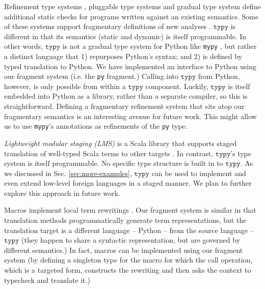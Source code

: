 \documentclass[preprint,10pt]{sigplanconf}
\newcommand{\typy}{\texttt{typy}}
\newcommand{\lip}[1]{\lstinline[language=Python,basicstyle=\ttfamily\footnotesize,deletendkeywords={tuple,buffer,map}]{#1}}
\newcommand{\li}[1]{\lip{#1}}
\begin{document}
Refinement type systems \cite{Freeman91}, pluggable type systems \cite{Brac04a,Andreae:2006:FIP:1167473.1167479,brown2016build,DBLP:journals/toplas/MarkstrumMEMAN10} and gradual type system \cite{Siek06a,siek2007gradual} define additional static checks for programs written against an existing semantics. Some of these systems support fragmentary definitions of new analyses \cite{DBLP:journals/toplas/MarkstrumMEMAN10,brown2016build}. $\typy$ is different in that its semantics (static and dynamic) is itself programmable. In other words, $\typy$ is not a gradual type system for Python like \texttt{mypy} \cite{mypy}, but rather a distinct language that 1) repurposes Python's syntax; and 2) is defined by typed translation to Python. We have implemented an interface to Python using our fragment system (i.e. the \li{py} fragment.) Calling into $\typy$ from Python, however, is only possible from within a $\typy$ component. Luckily, $\typy$ is itself embedded into Python as a library, rather than a separate compiler, so this is straightforward. Defining a fragmentary refinement system that sits atop our fragmentary semantics is an interesting avenue for future work. This might allow us to use \texttt{mypy}'s annotations as refinements of the \li{py} type.  %

\emph{Lightweight modular staging (LMS)} is a Scala library that supports staged translation of well-typed Scala terms to other targets \cite{Rompf:2012:LMS}. In contrast, $\typy$'s type system is itself  programmable. No specific type structure is built in to $\typy$. As we discussed in Sec. \ref{sec:more-examples}, $\typy$ can be used to implement and even extend low-level foreign languages in a staged manner. We plan to further explore this approach in future work.

Macros implement local term rewritings \cite{Hart63a,ScalaMacros2013}. Our fragment system is similar in that translation methods  programmatically generate term representations, but the translation target is a different language -- Python -- from the source language -- $\typy$ (they happen to share a syntactic representation, but are governed by different semantics.) In fact, macros can be implemented using our fragment system (by defining a singleton type for the macro for which the call operation, which is a targeted form, constructs the rewriting and then asks the context to typecheck and translate it.)
\end{document}
